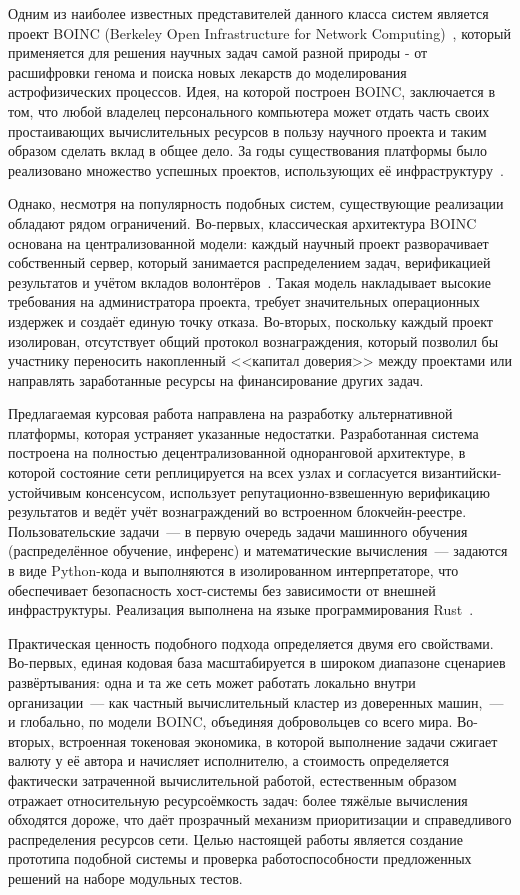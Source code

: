 \documentclass[a4paper,11pt]{extarticle}
\begin{document}
Одним из наиболее известных представителей данного класса систем является
проект BOINC (Berkeley Open Infrastructure for Network Computing)~\cite{boincwebsite},
который применяется для решения научных задач самой разной природы - от
расшифровки генома и поиска новых лекарств до моделирования астрофизических
процессов. Идея, на которой построен BOINC, заключается в том, что любой
владелец персонального компьютера может отдать часть своих простаивающих
вычислительных ресурсов в пользу научного проекта и таким образом сделать вклад
в общее дело. За годы существования платформы было реализовано множество
успешных проектов, использующих её инфраструктуру~\cite{anderson_boinc}.

Однако, несмотря на популярность подобных систем, существующие реализации
обладают рядом ограничений. Во-первых, классическая архитектура BOINC основана
на централизованной модели: каждый научный проект разворачивает собственный
сервер, который занимается распределением задач, верификацией результатов и
учётом вкладов волонтёров~\cite{boincwebsite_arcitecture}. Такая модель
накладывает высокие требования на администратора проекта, требует
значительных операционных издержек и создаёт единую точку отказа. Во-вторых,
поскольку каждый проект изолирован, отсутствует общий протокол вознаграждения,
который позволил бы участнику переносить накопленный <<капитал доверия>> между
проектами или направлять заработанные ресурсы на финансирование других задач.

Предлагаемая курсовая работа направлена на разработку альтернативной платформы,
которая устраняет указанные недостатки. Разработанная система построена на
полностью децентрализованной одноранговой архитектуре, в которой состояние сети
реплицируется на всех узлах и согласуется византийски-устойчивым консенсусом,
использует репутационно-взвешенную верификацию результатов и ведёт учёт
вознаграждений во встроенном блокчейн-реестре. Пользовательские задачи~--- в
первую очередь задачи машинного обучения (распределённое обучение, инференс) и
математические вычисления~--- задаются в виде Python-кода и выполняются в
изолированном интерпретаторе, что обеспечивает безопасность хост-системы без
зависимости от внешней инфраструктуры. Реализация выполнена на языке
программирования Rust~\cite{rust_book}.

Практическая ценность подобного подхода определяется двумя его свойствами.
Во-первых, единая кодовая база масштабируется в широком диапазоне сценариев
развёртывания: одна и та же сеть может работать локально внутри организации~---
как частный вычислительный кластер из доверенных машин,~--- и глобально, по
модели BOINC, объединяя добровольцев со всего мира. Во-вторых, встроенная
токеновая экономика, в которой выполнение задачи сжигает валюту у её автора и
начисляет исполнителю, а стоимость определяется фактически затраченной
вычислительной работой, естественным образом отражает относительную ресурсоёмкость
задач: более тяжёлые вычисления обходятся дороже, что даёт прозрачный механизм
приоритизации и справедливого распределения ресурсов сети. Целью настоящей
работы является создание прототипа подобной системы и проверка
работоспособности предложенных решений на наборе модульных тестов.
\end{document}
